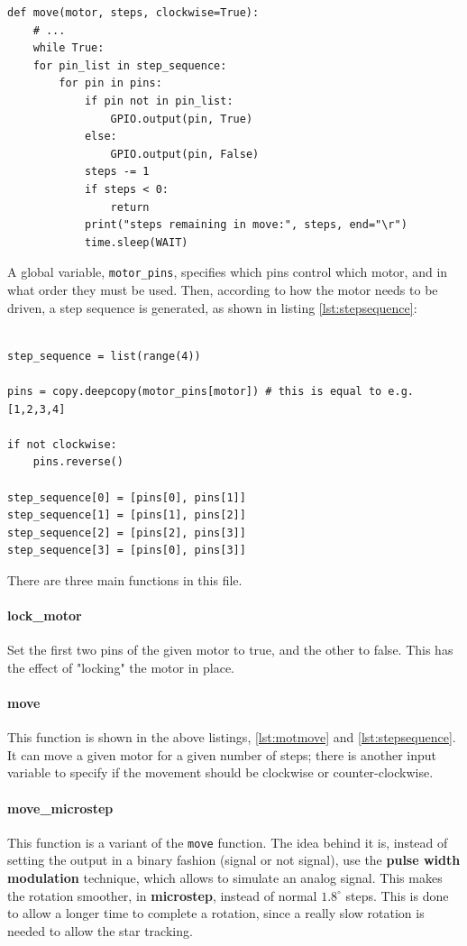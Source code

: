 \documentclass[]{article}
\begin{document}
\begin{lstlisting}[language=PythonPlus, label={lst:motmove}, caption=The main code for the function \texttt{move} in \texttt{motors.py}.]
def move(motor, steps, clockwise=True):
	# ...
	while True:
	for pin_list in step_sequence:
		for pin in pins:
			if pin not in pin_list:
				GPIO.output(pin, True)
			else:
				GPIO.output(pin, False)
			steps -= 1
			if steps < 0:
				return
			print("steps remaining in move:", steps, end="\r")
			time.sleep(WAIT)
\end{lstlisting}

A global variable, \texttt{motor\_pins}, specifies which pins control which motor, and in what order they must be used. Then, according to how the motor needs to be driven, a step sequence is generated, as shown in listing \ref{lst:stepsequence}:

\begin{lstlisting}[language=PythonPlus, label={lst:stepsequence}, caption=Generation of a step sequence to move a motor inside the \texttt{move} function.]

step_sequence = list(range(4))

pins = copy.deepcopy(motor_pins[motor]) # this is equal to e.g. [1,2,3,4]

if not clockwise:
	pins.reverse()

step_sequence[0] = [pins[0], pins[1]]
step_sequence[1] = [pins[1], pins[2]]
step_sequence[2] = [pins[2], pins[3]]
step_sequence[3] = [pins[0], pins[3]]

\end{lstlisting}

There are three main functions in this file. 

\paragraph{lock\_motor} Set the first two pins of the given motor to true, and the other to false. This has the effect of "locking" the motor in place.

\paragraph{move} This function is shown in the above listings, \ref{lst:motmove} and \ref{lst:stepsequence}. It can move a given motor for a given number of steps; there is another input variable to specify if the movement should be clockwise or counter-clockwise. 

\paragraph{move\_microstep} This function is a variant of the \texttt{move} function. The idea behind it is, instead of setting the output in a binary fashion (signal or not signal), use the \textbf{pulse width modulation} technique, which allows to simulate an analog signal. This makes the rotation smoother, in \textbf{microstep}, instead of normal $1.8^\circ$ steps. This is done to allow a longer time to complete a rotation, since a really slow rotation is needed to allow the star tracking. 
\end{document}
